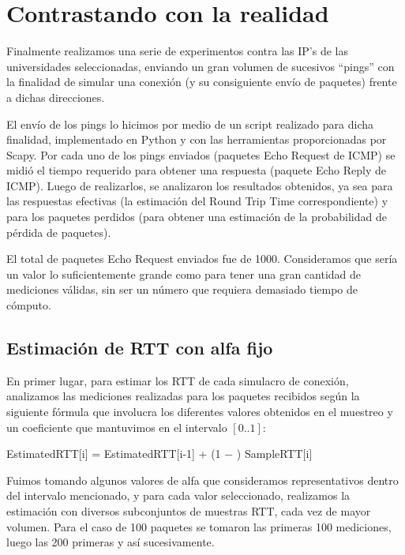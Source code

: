 \section{Contrastando con la realidad}

Finalmente realizamos una serie de experimentos contra las IP's de las universidades seleccionadas, enviando un gran volumen de sucesivos ``pings'' con la finalidad de simular una conexión (y su consiguiente envío de paquetes) frente a dichas direcciones.

El envío de los pings lo hicimos por medio de un script realizado para dicha finalidad, implementado en Python y con las herramientas proporcionadas por Scapy. Por cada uno de los pings enviados (paquetes Echo Request de ICMP) se midió el tiempo requerido para obtener una respuesta (paquete Echo Reply de ICMP). Luego de realizarlos, se analizaron los resultados obtenidos, ya sea para las respuestas efectivas (la estimación del Round Trip Time correspondiente) y para los paquetes perdidos (para obtener una estimación de la probabilidad de pérdida de paquetes). 

El total de paquetes Echo Request enviados fue de 1000. Consideramos que sería un valor lo suficientemente grande como para tener una gran cantidad de mediciones válidas, sin ser un número que requiera demasiado tiempo de cómputo.

\subsection{Estimación de RTT con alfa fijo}

En primer lugar, para estimar los RTT de cada simulacro de conexión, analizamos las mediciones realizadas para los paquetes recibidos según la siguiente fórmula que involucra los diferentes valores obtenidos en el muestreo y un coeficiente \alpha que mantuvimos en el intervalo $[0..1]$:

\begin{center}
EstimatedRTT[i] = \alpha \texttimes EstimatedRTT[i-1] + (1 − \alpha) \texttimes SampleRTT[i]
\end{center}

Fuimos tomando algunos valores de alfa que consideramos representativos dentro del intervalo mencionado, y para cada valor seleccionado, realizamos la estimación con diversos subconjuntos de muestras RTT, cada vez de mayor volumen. Para el caso de 100 paquetes se tomaron las primeras 100 mediciones, luego las 200 primeras y así sucesivamente.

